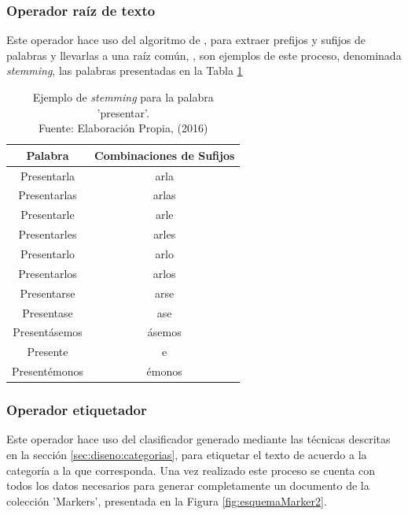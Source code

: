 \subsubsection*{Operador raíz de texto}
\label{subsubsec:6op}

Este operador hace uso del algoritmo de \cite{Porter}, para extraer prefijos y sufijos de palabras y llevarlas a una raíz común, \cite{StemmingLema}, son ejemplos de este proceso, denominada \textit{stemming}, las palabras presentadas en la Tabla \ref{tab:ejstemming}

\begin{table}[H]
\centering
\caption[Ejemplo de \textit{stemming} para la palabra 'presentar'.]{Ejemplo de \textit{stemming} para la palabra 'presentar'.\\Fuente: Elaboración Propia, (2016)}
\label{tab:ejstemming}
\begin{tabular}{|c|c|}
\hline
\textbf{Palabra} & \textbf{Combinaciones de Sufijos} \\ \hline
Presentarla      & arla                              \\ \hline
Presentarlas     & arlas                             \\ \hline
Presentarle      & arle                              \\ \hline
Presentarles     & arles                             \\ \hline
Presentarlo      & arlo                              \\ \hline
Presentarlos     & arlos                             \\ \hline
Presentarse      & arse                              \\ \hline
Presentase       & ase                               \\ \hline
Presentásemos    & ásemos                            \\ \hline
Presente         & e                                 \\ \hline
Presentémonos    & émonos                            \\ \hline
\end{tabular}
\end{table}

\subsubsection*{Operador etiquetador}
\label{subsubsec:7op}

Este operador hace uso del clasificador generado mediante las técnicas descritas en la sección \ref{sec:diseno:categorias}, para etiquetar el texto de acuerdo a la categoría a la que corresponda. Una vez realizado este proceso se cuenta con todos los datos necesarios para generar completamente un documento de la colección 'Markers', presentada en la Figura \ref{fig:esquemaMarker2}.

